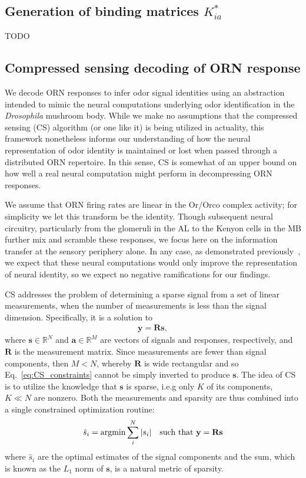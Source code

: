 \subsection{Generation of binding matrices $K^*_{ia}$}
 TODO

\subsection{Compressed sensing decoding of ORN response}
We decode ORN responses to infer odor signal identities using an abstraction intended to mimic the neural computations underlying odor identification in the \textit{Drosophila} mushroom body. While we make no assumptions that the compressed sensing (CS) algorithm (or one like it) is being utilized in actuality, this framework nonetheless informs our understanding of how the neural representation of odor identity is maintained or lost when passed through a distributed ORN repertoire. In this sense, CS is somewhat of an upper bound on how well a real neural computation might perform in decompressing ORN responses.

We assume that ORN firing rates are linear in the Or/Orco complex activity; for simplicity we let this transform be the identity. Though subsequent neural circuitry, particularly from the glomeruli in the AL to the Kenyon cells in the MB further mix and scramble these responses, we focus here on the information transfer at the sensory periphery alone. In any case, as demonstrated previously~\cite{vijay_1}, we expect that these neural computations would only improve the representation of neural identity, so we expect no negative ramifications for our findings.

CS addresses the problem of determining a sparse signal from a set of linear measurements, when the number of measurements is less than the signal dimension. Specifically, it is a solution to 
\begin{align}
\mathbf y = \mathbf R\mathbf s,
\label{eq:CS_constraints}
\end{align} where $\mathbf s \in \mathbb{R}^N$ and $\mathbf a\in \mathbb{R}^M$ are vectors of signals and responses, respectively, and $\mathbf R$ is the measurement matrix. Since measurements are fewer than signal components, then $M < N$, whereby $\mathbf R$ is wide rectangular and so Eq.~\ref{eq:CS_constraints} cannot be simply inverted to produce $\mathbf s$. The idea of CS is to utilize the knowledge that $\mathbf s$ is sparse, i.e.g only $K$ of its components, $K \ll N$ are nonzero. Both the measurements and sparsity are thus combined into a single constrained optimization routine:
\begin{align}
\hat s_i = \textup{argmin} \sum_i^N |s_i| \quad \textup{such that } \mathbf y = \mathbf R\mathbf s
\label{eq:CS}
\end{align}
where $\hat s_i$ are the optimal estimates of the signal components and the sum, which is known as the $L_1$ norm of $\mathbf s$, is a natural metric of sparsity. 

